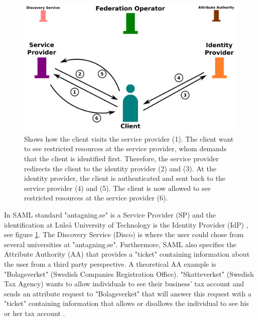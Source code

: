 \begin{figure}[ht]
\begin{center}
\includegraphics[scale=1]{Figures/identityFed.png}
\end{center}
\caption{Shows how the client visits the service provider (1). 
The client want to see restricted resources at the service provider, whom demands that the client is identified first. 
Therefore, the service provider redirects the client to the identity provider (2) and (3). 
At the identity provider, the client is authenticated and sent back to the service provider (4) and (5). 
The client is now allowed to see restricted resources at the service provider (6).\label{ch3:IdentityFed}}
\end{figure}

In SAML standard "antagning.se" is a Service Provider (SP) \cite[p.~11]{pdf:oasis-open-glossary} and the identification at 
Lule\r{a} University of Technology is the Identity Provider (IdP) \cite[p.~7]{pdf:oasis-open-glossary}, see figure \ref{ch3:IdentityFed}.
The Discovery Service (Disco) is where the user could chose from several universities at "antagning.se".
Furthermore, SAML also specifies the Attribute Authority (AA) that provides 
a "ticket" containing information about the user from a third party perspective.
A theoretical AA example is "Bolagsverket" (Swedish Companies Registration Office).
"Skatteverket" (Swedish Tax Agency) wants to allow individuals to see their business' tax account and sends an attribute request to "Bolagsverket" that will answer this request with a "ticket" containing information that allows or disallows the individual to see his or her tax account \cite[p.~284]{pdf:SOU}.

